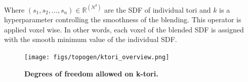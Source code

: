 Where $(s_1, s_2, \dots, s_n) \in \mathbb{R}^{(N^3)}$ are the SDF of individual tori and $k$ is a hyperparameter controlling the smoothness of the blending. This operator is applied voxel wise. In other words, each voxel of the blended SDF is assigned with the smooth minimum value of the individual SDF.

\begin{figure}[t]
  \centering
  \texttt{[image: figs/topogen/ktori\_overview.png]}
   \caption{\textbf{Degrees of freedom allowed on k-tori.}}
   \label{fig:ktori-overview}
\end{figure}









